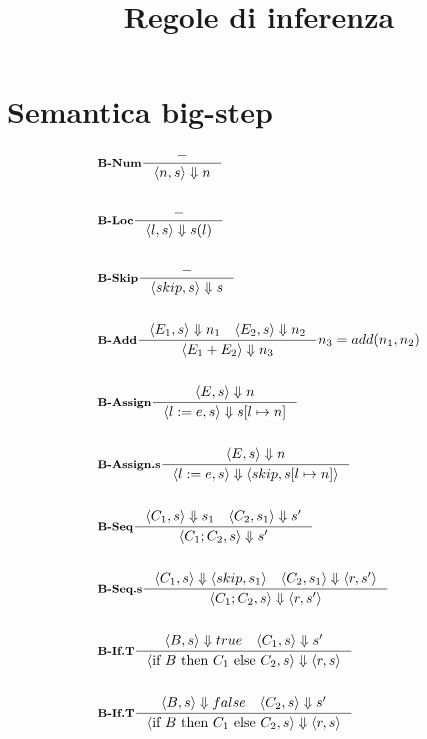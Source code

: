 \documentclass[a4paper, 10pt]{article}
\date{}
\newcommand{\infer}[4]{\inference[\textbf{#1}]{#2}{#3}#4 \\}
\newcommand{\brule}[2]{\langle #1 \rangle \Downarrow #2}
\newcommand{\memrep}[3]{#1 \lbrack #2 \mapsto #3 \rbrack}
\newcommand{\ifthenelse}[3]{\text{if } #1 \text{ then } #2 \text{ else } #3}
\begin{document}
	\title{\textbf{Regole di inferenza}}
	\maketitle
	\section*{Semantica big-step}
	\begin{multicols}{2}
	\begin{align*}
		&\infer{B-Num}{-}{\brule{n,s}{n}}{} \\
		&\infer{B-Loc}{-}{\brule{l,s}{s(l)}}{} \\
		&\infer{B-Skip}{-}{\brule{skip,s}{s}}{} \\ 
		&\infer{B-Add}{\brule{E_1,s}{n_1} \quad \brule{E_2,s}{n_2}}{\brule{E_1+E_2}{n_3}}{n_3 = add(n_1, n_2)} \\
		&\infer{B-Assign}{\brule{E,s}{n}}{\brule{l:=e,s}{\memrep{s}{l}{n}}}{} \\ &\infer{B-Assign.s}{\brule{E,s}{n}}{\brule{l:=e,s}{\langle skip, \memrep{s}{l}{n}} \rangle}{} \\
		&\infer{B-Seq}{\brule{C_1,s}{s_1} \quad \brule{C_2,s_1}{s'} }{\brule{C_1;C_2,s}{s'}}{} \\
		&\infer{B-Seq.s}{\brule{C_1,s}{\langle skip,s_1 \rangle} \quad \brule{C_2,s_1}{\langle r,s' \rangle} }{\brule{C_1;C_2,s}{\langle r,s' \rangle}}{} \\
		&\infer{B-If.T}{\brule{B,s}{true} \quad \brule{C_1,s}{s'}}{\brule{\ifthenelse{B}{C_1}{C_2},s}{\langle r, s\rangle}}{} \\
		&\infer{B-If.T}{\brule{B,s}{false} \quad \brule{C_2,s}{s'}}{\brule{\ifthenelse{B}{C_1}{C_2},s}{\langle r, s\rangle}}{} \\
	\end{align*}
	\end{multicols}
\newpage
\end{document}
